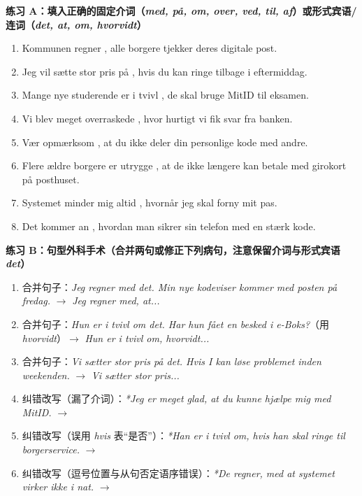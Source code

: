 \textbf{练习 A：填入正确的固定介词（\textit{med, på, om, over, ved, til, af}）或形式宾语/连词（\textit{det, at, om, hvorvidt}）}
\begin{enumerate}
  \item Kommunen regner \underline{\hspace{1.4cm}}, \underline{\hspace{1.2cm}} alle borgere tjekker deres digitale post.
  \item Jeg vil sætte stor pris på \underline{\hspace{1.4cm}}, hvis du kan ringe tilbage i eftermiddag.
  \item Mange nye studerende er i tvivl \underline{\hspace{1.4cm}}, \underline{\hspace{1.8cm}} de skal bruge MitID til eksamen.
  \item Vi blev meget overraskede \underline{\hspace{1.4cm}}, hvor hurtigt vi fik svar fra banken.
  \item Vær opmærksom \underline{\hspace{1.4cm}}, at du ikke deler din personlige kode med andre.
  \item Flere ældre borgere er utrygge \underline{\hspace{1.4cm}}, at de ikke længere kan betale med girokort på posthuset.
  \item Systemet minder mig altid \underline{\hspace{1.4cm}}, hvornår jeg skal forny mit pas.
  \item Det kommer an \underline{\hspace{1.4cm}}, hvordan man sikrer sin telefon med en stærk kode.
\end{enumerate}

\textbf{练习 B：句型外科手术（合并两句或修正下列病句，注意保留介词与形式宾语 \textit{det}）}
\begin{enumerate}
  \item 合并句子：\textit{Jeg regner med det. Min nye kodeviser kommer med posten på fredag.} $\rightarrow$ \textit{Jeg regner med, at...}
  \item 合并句子：\textit{Hun er i tvivl om det. Har hun fået en besked i e-Boks?}（用 \textit{hvorvidt}）$\rightarrow$ \textit{Hun er i tvivl om, hvorvidt...}
  \item 合并句子：\textit{Vi sætter stor pris på det. Hvis I kan løse problemet inden weekenden.} $\rightarrow$ \textit{Vi sætter stor pris...}
  \item 纠错改写（漏了介词）：\textit{*Jeg er meget glad, at du kunne hjælpe mig med MitID.} $\rightarrow$
  \item 纠错改写（误用 \textit{hvis} 表“是否”）：\textit{*Han er i tvivl om, hvis han skal ringe til borgerservice.} $\rightarrow$
  \item 纠错改写（逗号位置与从句否定语序错误）：\textit{*De regner, med at systemet virker ikke i nat.} $\rightarrow$
\end{enumerate}

